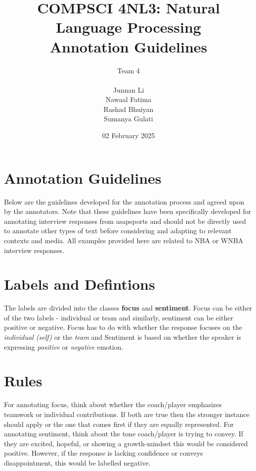 \documentclass[titlepage]{article}
\title{COMPSCI 4NL3: Natural Language Processing\\
Annotation Guidelines}
\author{Team 4\\
\\ Junnan Li
\\ Nawaal Fatima
\\ Rashad Bhuiyan
\\ Sumanya Gulati}
\date{02 February 2025}
\begin{document}
\begin{titlepage}
  \maketitle
\end{titlepage}

\newpage

\section{Annotation Guidelines}
Below are the guidelines developed for the annotation process and agreed upon 
by the annotators. Note that these guidelines have been specifically developed for 
annotating interview responses from asapsports and should not be directly used to
annotate other types of text before considering and adapting to relevant contexts and media. 
All examples provided here are related to NBA or WNBA interview responses.

\section{Labels and Defintions}
The labels are divided into the classes \textbf{focus} and \textbf{sentiment}. Focus can be either of 
the two labels - individual or team and similarly, sentiment can be either positive or negative. 
Focus has to do with whether the response focuses on the \emph{individual (self)} or the \emph{team} and 
Sentiment is based on whether the speaker is expressing \emph{positive} or \emph{negative} emotion.

\section{Rules}
For annotating focus, think about whether the coach/player emphasizes teamwork or individual contributions.
If both are true then the stronger instance should apply or the one that comes first if they are equally 
represented. For annotating sentiment, think about the tone coach/player is trying to convey. If they are 
excited, hopeful, or showing a growth-mindset this would be considered positive. However, if the response 
is lacking confidence or conveys disappointment, this would be labelled negative.
\end{document}
